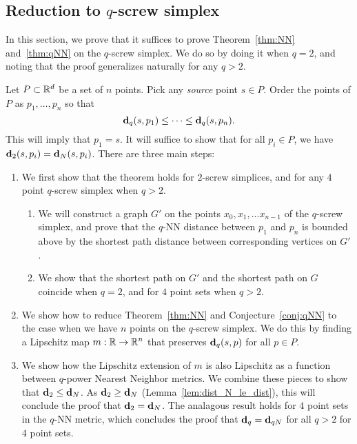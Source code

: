 \subsection{Reduction to $q$-screw simplex} %
\label{sec:reduction-to-screw}
In this section, we prove that it suffices to prove Theorem~\ref{thm:NN}
and~\ref{thm:qNN} on the $q$-screw simplex. We do so by doing it when
$q=2$, and noting that the proof generalizes naturally for any $q > 2$.

  Let $P\subset \mathbb{R}^d$ be a set of $n$ points.
  Pick any \emph{source} point $s\in P$.
  Order the points of $P$ as $p_1,\ldots ,p_n$ so that
  \[
    \mathbf{d}_q(s,p_1) \le \cdots \le \mathbf{d}_q(s, p_n).
  \]
  This will imply that $p_1 = s$.
  It will suffice to show that for all $p_i\in P$, we have $\mathbf{d}_2(s,p_i) = \mathbf{d}_N(s,p_i)$.
  There are three main steps:
  \begin{enumerate}
  \item We first show that the theorem holds for $2$-screw simplices, and
for any $4$ point $q$-screw simplex when $q > 2$.
\begin{enumerate}
  \item We will construct a graph $G'$ on the points $x_0, x_1, \ldots
x_{n-1}$ of the $q$-screw simplex, and prove that the $q$-NN distance
between $p_1$ and $p_n$ is bounded above by the shortest path distance
between corresponding vertices on $G'$.
	\item We show that the shortest path on $G'$ and the shortest path
on $G$ coincide when $q=2$, and for $4$ point sets when $q>2$.  
\end{enumerate}
  \item We show how to reduce Theorem~\ref{thm:NN} and
Conjecture~\ref{conj:qNN} to the case when we
have $n$ points on the $q$-screw simplex. We do this by finding a Lipschitz
map $m:\mathbb{R} \rightarrow \mathbb{R}^n$ that preserves $\mathbf{d}_q(s,p)$ for all $p \in P$.
  \item We show how the Lipschitz extension of $m$ is also
Lipschitz as a function between $q$-power Nearest Neighbor metrics. 
We combine these pieces to show that $\mathbf{d}_2 \le \mathbf{d}_N$.  As $\mathbf{d}_2
\ge \mathbf{d}_N$ (Lemma~\ref{lem:dist_N_le_dist}), this will conclude the proof
that $\mathbf{d}_2 = \mathbf{d}_N$. The analagous result holds for $4$ point sets in
the $q$-NN metric, which concludes the proof that $\mathbf{d}_q = \mathbf{d}_{qN}$
for all $q>2$ for $4$ point sets.
  \end{enumerate}
  
  
  
  
  
